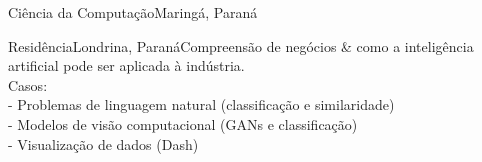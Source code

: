 \documentclass[
    10pt,
    english,
]{article}
\begin{document}
{Ciência da Computação}{Maringá, Paraná}{}

{Residência}{Londrina, Paraná}{Compreensão de negócios \& como a inteligência artificial pode ser aplicada à indústria. \\ Casos: \\
    \tab - Problemas de linguagem natural (classificação e similaridade) \\
    \tab - Modelos de visão computacional (GANs e classificação) \\
    \tab - Visualização de dados (Dash)}
\end{document}
